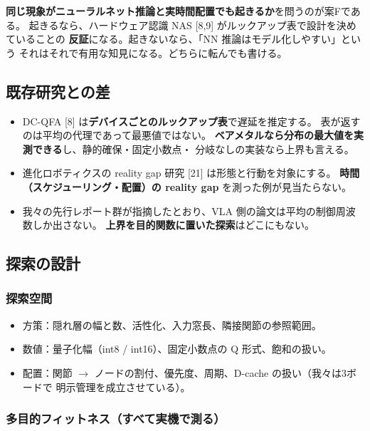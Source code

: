 \documentclass[11pt,a4paper]{article}
\newcommand{\prob}[1]{\textbf{\textcolor{red!55!black}{#1}}}
\newcommand{\keyp}[1]{\textbf{\textcolor{blue!45!black}{#1}}}
\begin{document}
\noindent
\keyp{同じ現象がニューラルネット推論と実時間配置でも起きるか}を問うのが案Fである。
起きるなら、ハードウェア認識 NAS [8,9] がルックアップ表で設計を決めていることの
\prob{反証}になる。起きないなら、「NN 推論はモデル化しやすい」という
それはそれで有用な知見になる。どちらに転んでも書ける。

\subsection{既存研究との差}

\begin{itemize}[leftmargin=1.4em,itemsep=3pt]
  \item DC-QFA [8] は\keyp{デバイスごとのルックアップ表}で遅延を推定する。
        表が返すのは平均の代理であって最悪値ではない。
        \keyp{ベアメタルなら分布の最大値を実測できる}し、静的確保・固定小数点・
        分岐なしの実装なら上界も言える。
  \item 進化ロボティクスの reality gap 研究 [21] は形態と行動を対象にする。
        \keyp{時間（スケジューリング・配置）の reality gap} を測った例が見当たらない。
  \item 我々の先行レポート群が指摘したとおり、VLA 側の論文は平均の制御周波数しか出さない。
        \keyp{上界を目的関数に置いた探索}はどこにもない。
\end{itemize}

\subsection{探索の設計}

\subsubsection*{探索空間}

\begin{itemize}[leftmargin=1.4em,itemsep=2pt]
  \item 方策：隠れ層の幅と数、活性化、入力窓長、隣接関節の参照範囲。
  \item 数値：量子化幅（int8 / int16）、固定小数点の Q 形式、飽和の扱い。
  \item 配置：関節 $\to$ ノードの割付、優先度、周期、D-cache の扱い（我々は3ボードで
        明示管理を成立させている）。
\end{itemize}

\subsubsection*{多目的フィットネス（すべて実機で測る）}
\end{document}
